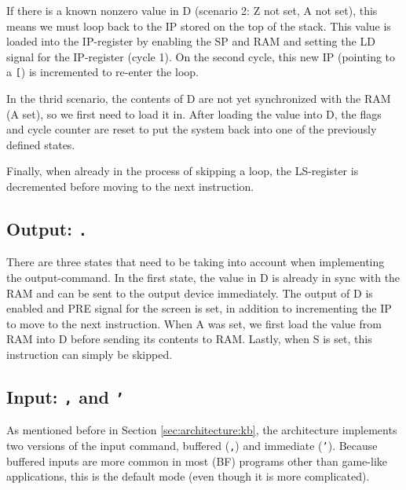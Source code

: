 If there is a known nonzero value in D (scenario 2: Z not set, A not set), this means we must loop back to the IP stored on the top of the stack. This value is loaded into the IP-register by enabling the SP and RAM and setting the LD signal for the IP-register (cycle 1). On the second cycle, this new IP (pointing to a \texttt{[}) is incremented to re-enter the loop.
  
In the thrid scenario, the contents of D are not yet synchronized with the RAM (A set), so we first need to load it in. After loading the value into D, the flags and cycle counter are reset to put the system back into one of the previously defined states.

Finally, when already in the process of skipping a loop, the LS-register is decremented before moving to the next instruction.

\subsection{Output: \texttt{.}}
There are three states that need to be taking into account when implementing the output-command. In the first state, the value in D is already in sync with the RAM and can be sent to the output device immediately. The output of D is enabled and PRE signal for the screen is set, in addition to incrementing the IP to move to the next instruction. When A was set, we first load the value from RAM into D before sending its contents to RAM. Lastly, when S is set, this instruction can simply be skipped.

\subsection{Input: \texttt{,} and \texttt{'}}
As mentioned before in Section \ref{sec:architecture:kb}, the architecture implements two versions of the input command, buffered (\texttt{,}) and immediate (\texttt{'}). Because buffered inputs are more common in most (BF) programs other than game-like applications, this is the default mode (even though it is more complicated).

